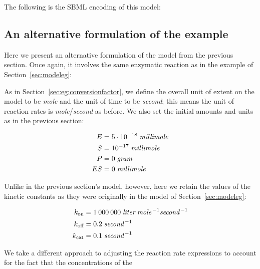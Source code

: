 The following is the SBML encoding of this model:



\subsection{An alternative formulation of the  example}
\label{sec:eg:conversionfactor2}

Here we present an alternative formulation of the model from the
previous section.  Once again, it involves the same enzymatic
reaction as in the example of Section~\ref{sec:modeleg}:
\begin{center}
\end{center}
As in Section~\ref{sec:eg:conversionfactor}, we define the overall
unit of extent on the model to be \emph{mole} and the unit of time
to be \emph{second}; this means the unit of reaction rates is
\emph{mole}/\emph{second} as before.  We also set the initial
amounts and units as in the previous section:
\begin{linenomath}
  \begin{align*}
    E   & = 5 \cdot 10^{-18}\; \emph{millimole} \\
    S   & = 10^{-17}\; \emph{millimole} \\
    P   & = 0\; \emph{gram} \\
    ES  & = 0\; \emph{millimole}
  \end{align*}
\end{linenomath}
Unlike in the previous section's model, however, here we retain
the values of the kinetic constants as they were originally in the
model of Section~\ref{sec:modeleg}:
\begin{linenomath}
  \begin{align*}
    k_\text{on}  & = 1\:000\:000 \;\emph{liter} \;\emph{mole}^{\,-1} \emph{second}^{\,-1}\\
    k_\text{off} & = 0.2 \;\emph{second}^{\,-1}\\
    k_\text{cat} & = 0.1 \;\emph{second}^{\,-1}
  \end{align*}
\end{linenomath}
We take a different approach to adjusting the reaction rate
expressions to account for the fact that the concentrations of the

